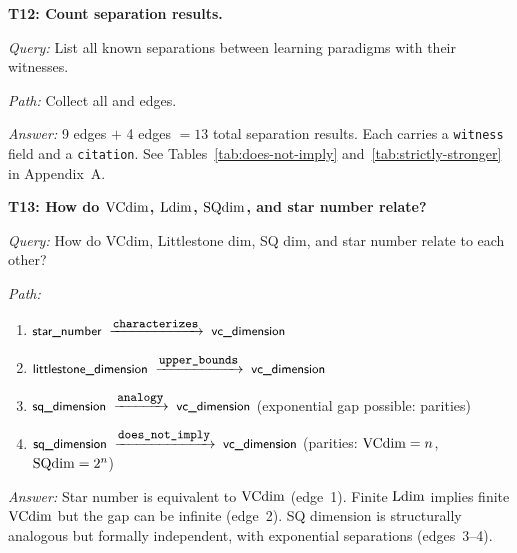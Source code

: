 \begin{traversal}
\textbf{T12: Count separation results.}\par\medskip
\emph{Query:} List all known separations between learning paradigms with their witnesses.\par
\emph{Path:} Collect all  and  edges.\par
\emph{Answer:} 9  edges $+$ 4  edges $= 13$ total separation results.  Each carries a \texttt{witness} field and a \texttt{citation}. See Tables~\ref{tab:does-not-imply} and~\ref{tab:strictly-stronger} in Appendix~A.
\end{traversal}

\begin{traversal}
\textbf{T13: How do $\mathrm{VCdim}$, $\mathrm{Ldim}$, $\mathrm{SQdim}$, and star number relate?}\par\medskip
\emph{Query:} How do VCdim, Littlestone dim, SQ dim, and star number relate to each other?\par
\emph{Path:}\par
\begin{enumerate}[leftmargin=2em, nosep]
  \item $\edge{star\_number}{characterizes}{vc\_dimension}$ \cite{Hanneke2024b}
  \item $\edge{littlestone\_dimension}{upper\_bounds}{vc\_dimension}$ \cite{Littlestone1988}
  \item $\edge{sq\_dimension}{analogy}{vc\_dimension}$ (exponential gap possible: parities)
  \item $\edge{sq\_dimension}{does\_not\_imply}{vc\_dimension}$ (parities: $\mathrm{VCdim} = n$, $\mathrm{SQdim} = 2^n$)
\end{enumerate}
\emph{Answer:} Star number is equivalent to $\mathrm{VCdim}$ (edge~1). Finite $\mathrm{Ldim}$ implies finite $\mathrm{VCdim}$ but the gap can be infinite (edge~2). SQ dimension is structurally analogous but formally independent, with exponential separations (edges~3--4).
\end{traversal}

